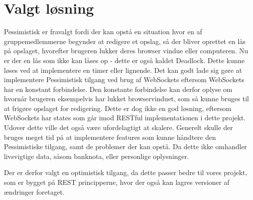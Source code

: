 \section{Valgt løsning}\label{sec:chosen_solution}
Pessimistisk er fravalgt fordi der kan opstå en situation hvor en af gruppemedlemmerne begynder at redigere et opslag, så der bliver oprettet en lås på opslaget, hvorefter brugeren lukker deres browser vindue eller computeren. Nu er der en lås som ikke kan låses op - dette er også kaldet Deadlock\cite{deadlock}. Dette kunne løses ved at implementere en timer eller lignende. Det kan godt lade sig gøre at implementere Pessimistisk tilgang ved brug af WebSockets\cite{websockets} eftersom WebSockets har en konstant forbindelse. Den konstante forbindelse kan derfor oplyse om hvornår brugeren eksempelvis har lukket browservinduet, som så kunne bruges til at frigøre opslaget for redigering. Dette er dog ikke en god løsning, eftersom WebSockets har states som går imod RESTful implementationen i dette projekt. Udover dette ville det også være ufordelagtigt at skalere.
Generelt skulle der bruges meget tid på at implementere features som kunne håndtere den Pessimistiske tilgang, samt de problemer der kan opstå. Da dette ikke omhandler livsvigtige data, såsom banknota, eller personlige oplysninger. 

Der er derfor valgt en optimistisk tilgang, da dette passer bedre til vores projekt, som er bygget på REST principperne, hvor der også kan lagres versioner af ændringer foretaget. 
